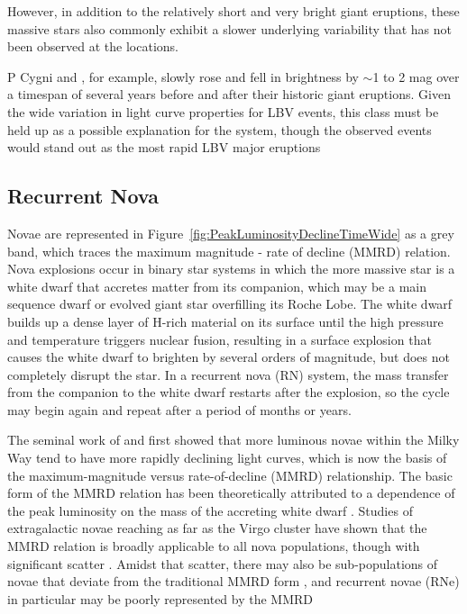 However, in addition to the relatively short and very
bright giant eruptions, these massive stars also commonly exhibit a
slower underlying variability that has not been observed at the \spock
locations.

P Cygni and \etaCar, for example, slowly rose and fell in
brightness by $\sim$1 to 2 mag over a timespan of several years before
and after their historic giant eruptions.  Given the wide variation in
light curve properties for LBV events, this class must be held up as a possible 
explanation for the \spock system, though the observed \spock events would stand out as the most rapid LBV major eruptions 


\subsection{Recurrent Nova}

Novae are represented in
Figure~\ref{fig:PeakLuminosityDeclineTimeWide} as a grey band, which
traces the maximum magnitude - rate of decline (MMRD) relation.  Nova
explosions occur in binary star systems in which the more massive star
is a white dwarf that accretes matter from its companion, which may be
a main sequence dwarf or evolved giant star overfilling its Roche
Lobe. The white dwarf builds up a dense layer of H-rich material on
its surface until the high pressure and temperature triggers nuclear
fusion, resulting in a surface explosion that causes the white dwarf
to brighten by several orders of magnitude, but does not completely
disrupt the star. In a recurrent nova (RN) system, the mass transfer
from the companion to the white dwarf restarts after the explosion, so
the cycle may begin again and repeat after a period of months or
years.

The seminal work of \citet{Zwicky:1936} and \citet{McLaughlin:1939}
first showed that more luminous novae within the Milky Way tend to
have more rapidly declining light curves, which is now the basis of
the maximum-magnitude versus rate-of-decline (MMRD) relationship. The
basic form of the MMRD relation has been theoretically attributed to a
dependence of the peak luminosity on the mass of the accreting white
dwarf \citep[e.g.][]{Livio:1992}.  Studies of extragalactic novae
reaching as far as the Virgo cluster have shown that the MMRD relation
is broadly applicable to all nova populations, though with significant
scatter
\citep[e.g.][]{Ciardullo:1990,DellaValle:1995,Ferrarese:2003,Shafter:2011}.
Amidst that scatter, there may also be sub-populations of novae that
deviate from the traditional MMRD form \citep{Kasliwal:2011a}, and
recurrent novae (RNe) in particular may be poorly represented by the
MMRD \citep{Shafter:2011,Hachisu:2015}

